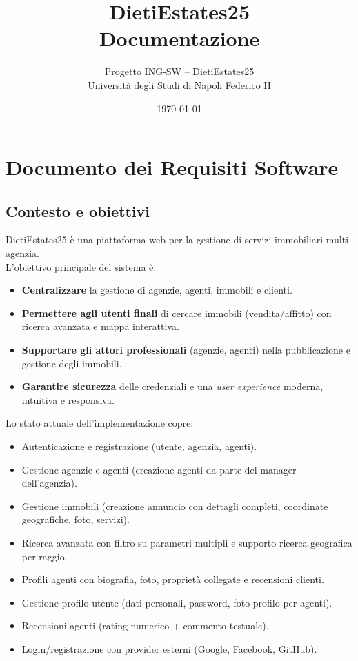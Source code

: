 \documentclass[a4paper,11pt]{report}
\title{DietiEstates25\\\large Documentazione}
\author{%
  Progetto ING-SW -- DietiEstates25\\[0.5em]
  \small Università degli Studi di Napoli Federico II
}
\date{\today}
\begin{document}
\maketitle
\tableofcontents

\chapter{Documento dei Requisiti Software}

\section{Contesto e obiettivi}

DietiEstates25 è una piattaforma web per la gestione di servizi immobiliari multi-agenzia.\\
L'obiettivo principale del sistema è:

\begin{itemize}[nosep]
  \item \textbf{Centralizzare} la gestione di agenzie, agenti, immobili e clienti.
  \item \textbf{Permettere agli utenti finali} di cercare immobili (vendita/affitto) con ricerca avanzata e mappa interattiva.
  \item \textbf{Supportare gli attori professionali} (agenzie, agenti) nella pubblicazione e gestione degli immobili.
  \item \textbf{Garantire sicurezza} delle credenziali e una \emph{user experience} moderna, intuitiva e responsiva.
\end{itemize}

Lo stato attuale dell’implementazione copre:

\begin{itemize}[nosep]
  \item Autenticazione e registrazione (utente, agenzia, agenti).
  \item Gestione agenzie e agenti (creazione agenti da parte del manager dell’agenzia).
  \item Gestione immobili (creazione annuncio con dettagli completi, coordinate geografiche, foto, servizi).
  \item Ricerca avanzata con filtro su parametri multipli e supporto ricerca geografica per raggio.
  \item Profili agenti con biografia, foto, proprietà collegate e recensioni clienti.
  \item Gestione profilo utente (dati personali, password, foto profilo per agenti).
  \item Recensioni agenti (rating numerico + commento testuale).
  \item Login/registrazione con provider esterni (Google, Facebook, GitHub).
\end{itemize}
\end{document}
